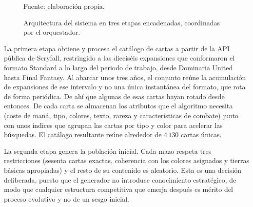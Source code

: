 \begin{figure}[H]
\centering
{}
\caption{Arquitectura del sistema en tres etapas encadenadas, coordinadas por el orquestador.}
\label{fig:pipeline}
\vspace{2pt}
{\footnotesize Fuente: elaboración propia.}
\end{figure}

La primera etapa obtiene y procesa el catálogo de cartas a partir de la API pública de Scryfall, restringido a las dieciséis expansiones que conformaron el formato Standard a lo largo del periodo de trabajo, desde Dominaria United hasta Final Fantasy. Al abarcar unos tres años, el conjunto reúne la acumulación de expansiones de ese intervalo y no una única instantánea del formato, que rota de forma periódica. De ahí que algunas de esas cartas hayan rotado desde entonces. De cada carta se almacenan los atributos que el algoritmo necesita (coste de maná, tipo, colores, texto, rareza y características de combate) junto con unos índices que agrupan las cartas por tipo y color para acelerar las búsquedas. El catálogo resultante reúne alrededor de $4\,130$ cartas únicas.

La segunda etapa genera la población inicial. Cada mazo respeta tres restricciones (sesenta cartas exactas, coherencia con los colores asignados y tierras básicas apropiadas) y el resto de su contenido es aleatorio. Esta es una decisión deliberada, puesto que el generador no introduce conocimiento estratégico, de modo que cualquier estructura competitiva que emerja después es mérito del proceso evolutivo y no de un sesgo inicial.

